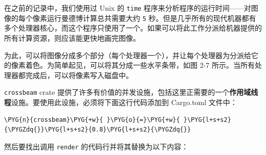 在之前的记录中，我们使用过 Unix 的 \texttt{time} 程序来分析程序的运行时间——对图像的每个像素运行曼德博计算总共需要大约 \texttt{5} 秒。但是几乎所有的现代机器都有多个处理器核心，而这个程序只使用了一个。如果可以将此工作分派给机器提供的所有计算资源，则应该能更快地画完图像。

为此，可以将图像分成多个部分（每个处理器一个），并让每个处理器为分派给它的像素着色。为简单起见，可以将其分成一些水平条带，如图 2-7 所示。当所有处理器都完成后，可以将像素写入磁盘中。


\texttt{crossbeam} crate 提供了许多有价值的并发设施，包括这里正需要的一个\textbf{作用域线程}设施。要使用此设施，必须将下面这行代码添加到 Cargo.toml 文件中：

\begin{Verbatim}[commandchars=\\\{\},breaklines=true,breakanywhere=true,fontsize=\codefont,xleftmargin=17bp]
\PYG{n}{crossbeam}\PYG{+w}{ }\PYG{o}{=}\PYG{+w}{ }\PYG{l+s+s2}{\PYGZdq{}}\PYG{l+s+s2}{0.8}\PYG{l+s+s2}{\PYGZdq{}}
\end{Verbatim}

然后要找出调用 \texttt{render} 的代码行并将其替换为以下内容：


